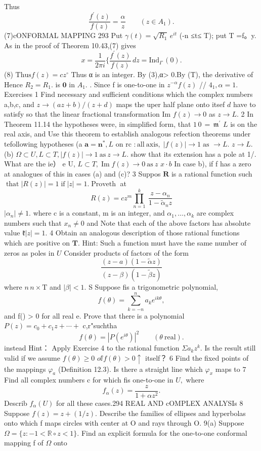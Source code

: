 Thus $$ {\frac{f^{\prime}(z)}{f(z)}}={\frac{\alpha}{z}}\qquad(z\in A_{1}). $$ (7)cONFORMAL MAPPING 293 Put $\gamma(t)={\sqrt{R_{1}}}\,e^{i t}$ (-n ≤t≤ T); put T =f。y. As in the proof of Theorem 10.43,(7) gives $$ x={\frac{1}{2\pi i}} \{\frac{f^{\prime}(z)}{f(z)}\,d z=\mathrm{Ind}_{\Gamma}\,(0). $$ (8) $\mathrm{Thus}f(z)=c z^{\circ}$ Thus α is an integer. By (3),α> 0.By (T), the derivative of Hence $R_{2}=R_{1}.$ is $\mathbf{0}$ in $A_{1}.$ . Since f is one-to-one in $z^{-\alpha}f(z)$ // $4_{1},\alpha=1.$ Exercises 1 Find necessary and sufficient conditions which the complex numbers a,b,c, and $z\to(a z+b)/(z+d)$ maps the uper half plane onto itsef $d$ have to satisfy so that the linear fractional transformation Im $f(z)\to0$ as $z\to L.$ 2 In Theorem 11.14 the hypotheses were, in simplified form, that $\scriptstyle1\,0\,=\,{\mathfrak{m}}^{\prime}$ ${\mathbf{}}L$ is on the real axis, and Use this theorem to establish analogous refection theorems under tefollowing hypotheses (a $\scriptstyle\mathbf{a}=\mathbf{n}^{*},L$ on rc $\mathrm{:}{\mathrm{all~axis,}}\;|f(z)|\to1\;{\mathrm{as}}$ $\to L.$ $z\to L.$ (b) $\Omega\subset U,L\subset T,|f(z)|\to1{\mathrm{~as~}}z\to L.$ show that its extension has a pole at 1/. What are the ie） e U, $L\subset T,\operatorname{Im}f(z)\to0{\mathrm{~as~}}z$ $\scriptstyle{x\cdot b}$ In case b), if f has a zero at analogues of this in cases (a) and (c)? 3 Suppos ${\boldsymbol{R}}$ is a rational function such $\operatorname{that}|R(z)|=1\operatorname{if}|z|=1.{\operatorname{Proveth}}$ at $$ R(z)=c z^{m}\prod_{n=1}^{k}\ {\frac{z-\alpha_{n}}{1-\tilde{\alpha}_{n}z}} $$ $|\alpha_{n}|\neq1.$ where c is a constant, m is an integer, and $\alpha_{1},\dots,\alpha_{k}$ are complex numbers such that $x_{n}\neq0$ and Note that each of the above factors has absolute value ${\mathfrak{k}}|z|=1.$ 4 Obtain an analogous description of those rational functions which are positive on ${\boldsymbol{T}}.$ Hint: Such a function must have the same number of zeros as poles in $\boldsymbol{\mathit{U}}$ Consider products of factors of the form $$ \frac{(z-a)(1-\tilde{\alpha}z)}{(z-\beta)(1-\tilde{\beta}z)} $$ where $\scriptstyle n\,\scriptstyle n\times\mathrm{T}$ and $|\beta|<1.$ S Suppose fis a trigonometric polynomial, $$ f(\theta)=\sum_{k=-n}^{n}a_{k}e^{i k\theta}, $$ and f() > 0 for all real e. Prove that there is a polynomial $P(z)=c_{0}+c_{1}z+\cdots+$ c,r"suchtha $$ f(\theta)=|P(e^{i\theta})|^{2}\qquad(\theta\ \mathrm{real}). $$ instead Hint： Apply Exercise 4 to the rational function $\Sigma a_{k}z^{k}.$ Is the result still valid if we assume $f(\theta)\geq0$ $o\mathbb{f}f(\theta)>0\uparrow$ itself？ 6 Find the fixed points of the mappings $\varphi_{a}$ (Definition 12.3). Is there a straight line which $\varphi_{x}$ maps to 7 Find all complex numbers c for which fis one-to-one in $U,$ where $$ f_{\alpha}(z)={\frac{z}{1+\alpha z^{2}}}. $$ Describ $f_{\alpha}(U)$ for all these cases.294 REAL AND cOMPLEX ANALYSIs 8 Suppose $f(z)=z+(1/z).$ Describe the families of ellipses and hyperbolas onto which f maps circles with center at O and rays through O. 9(a) Suppose $\Omega=\{z\colon-1<\mathbb{R}\circ z<1\}.$ Find an explicit formula for the one-to-one conformal mapping f of $\scriptstyle\Omega$ onto 
